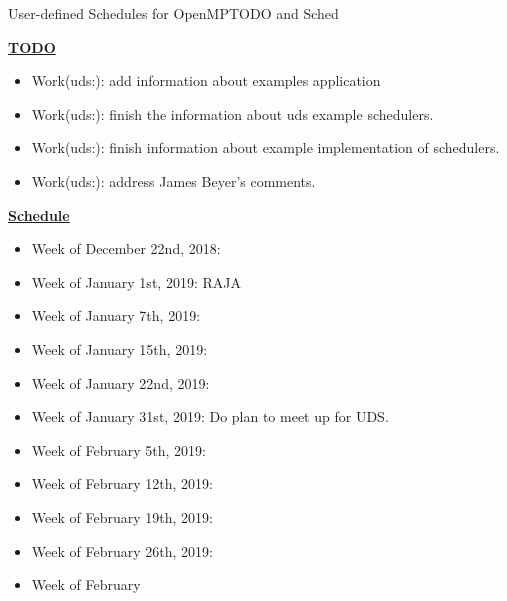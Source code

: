 \begin{frame}{User-defined Schedules for OpenMP}{TODO and Sched}
{
}

\begin{multicols}{3}
\underline{\bf{TODO}}
\begin{itemize}
\item  Work(uds:): add information about examples application  
\item Work(uds:): finish the information about uds example
schedulers. 
\item Work(uds:): finish information about example implementation of schedulers. 
\item Work(uds:): address James Beyer's comments. 
\end{itemize}

\underline{\bf{Schedule}}
\begin{itemize}
\item Week of December 22nd, 2018: 
\item Week of January 1st, 2019: RAJA 
\item Week of January 7th, 2019: 
\item Week of January 15th, 2019:
\item Week of January 22nd, 2019: 
\item Week of January 31st, 2019: Do plan to meet up for UDS. 
\item Week of February 5th, 2019: 
\item Week of February 12th, 2019: 
\item Week of February 19th, 2019:  
\item Week of February 26th, 2019: 
\item Week of February 
\end{itemize}

\end{multicols}
\end{frame}


